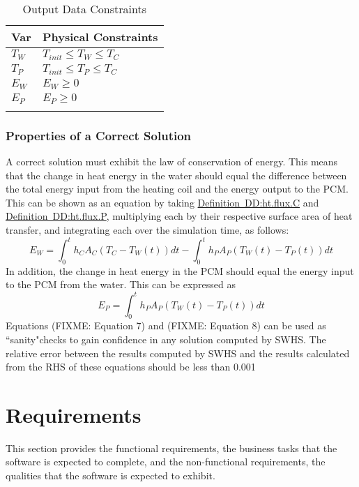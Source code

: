 \documentclass[12pt]{article}
\begin{document}
\begin{longtable}{l l}
\toprule
Var & Physical Constraints
\\
\midrule
${T_{W}}$ & ${T_{init}}\leq{}{T_{W}}\leq{}{T_{C}}$
\\
${T_{P}}$ & ${T_{init}}\leq{}{T_{P}}\leq{}{T_{C}}$
\\
${E_{W}}$ & ${E_{W}}\geq{}0$
\\
${E_{P}}$ & ${E_{P}}\geq{}0$
\\
\bottomrule
\caption{Output Data Constraints}
\label{Table:OutDataConstraints}
\end{longtable}
\subsubsection{Properties of a Correct Solution}
\label{Sec:CorSolProps}
A correct solution must exhibit the law of conservation of energy. This means that the change in heat energy in the water should equal the difference between the total energy input from the heating coil and the energy output to the PCM. This can be shown as an equation by taking \hyperref[DD:ht.flux.C]{Definition~DD:ht.flux.C} and \hyperref[DD:ht.flux.P]{Definition~DD:ht.flux.P}, multiplying each by their respective surface area of heat transfer, and integrating each over the simulation time, as follows:
\begin{dmath}
{E_{W}}=\int_{0}^{t}{{h_{C}} {A_{C}} \left({T_{C}}-{T_{W}}\left(t\right)\right)dt}-\int_{0}^{t}{{h_{P}} {A_{P}} \left({T_{W}}\left(t\right)-{T_{P}}\left(t\right)\right)dt}
\end{dmath}
In addition, the change in heat energy in the PCM should equal the energy input to the PCM from the water. This can be expressed as
\begin{dmath}
{E_{P}}=\int_{0}^{t}{{h_{P}} {A_{P}} \left({T_{W}}\left(t\right)-{T_{P}}\left(t\right)\right)dt}
\end{dmath}
Equations (FIXME: Equation 7) and (FIXME: Equation 8) can be used as ``sanity"checks to gain confidence in any solution computed by SWHS. The relative error between the results computed by SWHS and the results calculated from the RHS of these equations should be less than 0.001%
\section{Requirements}
\label{Sec:Requirements}
This section provides the functional requirements, the business tasks that the software is expected to complete, and the non-functional requirements, the qualities that the software is expected to exhibit.
\end{document}
